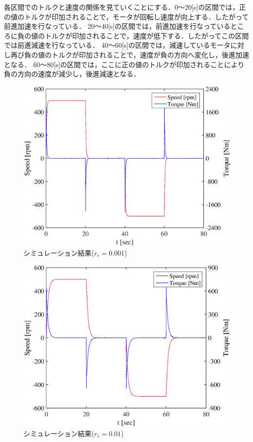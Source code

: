 \documentclass[a4paper,12pt]{jarticle}
\begin{document}
各区間でのトルクと速度の関係を見ていくことにする．0〜20[s]の区間では，正の値のトルクが印加されることで，モータが回転し速度が向上する．したがって前進加速を行なっている．
20〜40[s]の区間では，前進加速を行なっているところに負の値のトルクが印加されることで，速度が低下する．したがってこの区間では前進減速を行なっている．
40〜60[s]の区間では，減速しているモータに対し再び負の値のトルクが印加されることで，速度が負の方向へ変化し，後進加速となる．
60〜80[s]の区間では，ここに正の値のトルクが印加されることにより負の方向の速度が減少し，後進減速となる．
%
\begin{figure}[H]
 \begin{center}
 \hspace{-1.0cm}
  \includegraphics[scale=0.65]{../figure/eps/simout_1.eps}
  \caption{シミュレーション結果($ r_e = 0.001 $)}
  \label{sim1}
 \end{center}

\end{figure}
\begin{figure}[H]
 \begin{center}
 \hspace{-1.2cm}
  \includegraphics[scale=0.65]{../figure/eps/simout_2.eps}
  \caption{シミュレーション結果($ r_e = 0.01 $)}
  \label{sim2}
 \end{center}
\end{figure}
\end{document}
